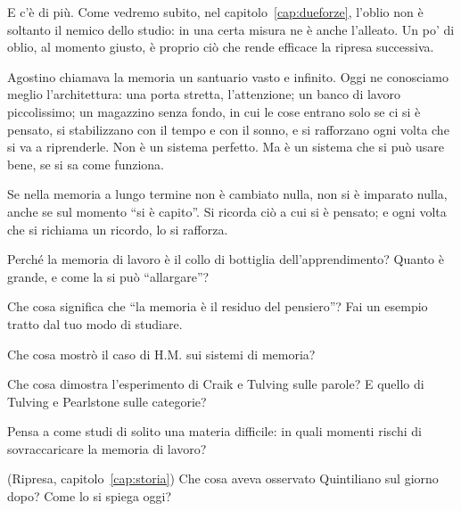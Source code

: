 E c'è di più. Come vedremo subito, nel capitolo~\ref{cap:dueforze},
l'oblio non è soltanto il nemico dello studio: in una certa misura ne è
anche l'alleato. Un po' di oblio, al momento giusto, è proprio ciò che
rende efficace la ripresa successiva.

\asterismo

Agostino chiamava la memoria un santuario vasto e infinito. Oggi ne
conosciamo meglio l'architettura: una porta stretta, l'attenzione; un
banco di lavoro piccolissimo; un magazzino senza fondo, in cui le cose
entrano solo se ci si è pensato, si stabilizzano con il tempo e con il
sonno, e si rafforzano ogni volta che si va a riprenderle. Non è un
sistema perfetto. Ma è un sistema che si può usare bene, se si sa come
funziona.

\begin{daricordare}
Se nella memoria a lungo termine non è cambiato nulla, non si è
imparato nulla, anche se sul momento \enquote{si è capito}. Si ricorda
ciò a cui si è pensato; e ogni volta che si richiama un ricordo, lo si
rafforza.
\end{daricordare}

\begin{domande}
  \item Perché la memoria di lavoro è il collo di bottiglia
        dell'apprendimento? Quanto è grande, e come la si può
        \enquote{allargare}?
  \item Che cosa significa che \enquote{la memoria è il residuo del
        pensiero}? Fai un esempio tratto dal tuo modo di studiare.
  \item Che cosa mostrò il caso di H.M. sui sistemi di memoria?
  \item Che cosa dimostra l'esperimento di Craik e Tulving sulle
        parole? E quello di Tulving e Pearlstone sulle categorie?
  \item Pensa a come studi di solito una materia difficile: in quali
        momenti rischi di sovraccaricare la memoria di lavoro?
  \item (Ripresa, capitolo~\ref{cap:storia}) Che cosa aveva osservato
        Quintiliano sul giorno dopo? Come lo si spiega oggi?
\end{domande}

